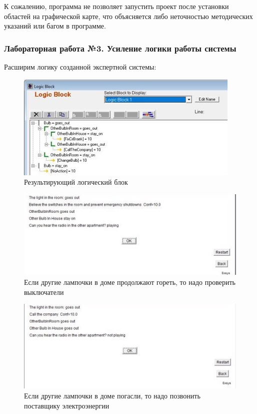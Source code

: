\documentclass[14pt,a4paper,report]{report}
\begin{document}
К сожалению, программа не позволяет запустить проект после установки областей на графической карте, что объясняется либо неточностью методических указаний или багом в программе.

\subsubsection{Лабораторная работа №3. Усиление логики работы системы}

Расширим логику созданной экспертной системы:

\begin{figure}[h!]
	\centering
	\includegraphics[scale = 0.85]{images/3_1.jpg}
	\caption{Результирующий логический блок}
\end{figure}



\begin{figure}[h!]

	\includegraphics[width=1\textwidth]{images/3_7.jpg}
	\caption{Если другие лампочки в доме продолжают гореть, то надо проверить выключатели}
\end{figure}

\begin{figure}[h!]
	\centering
	\includegraphics[scale = 1]{images/3_8.jpg}
	\caption{Если другие лампочки в доме погасли, то надо позвонить поставщику электроэнергии}
\end{figure}
\end{document}
